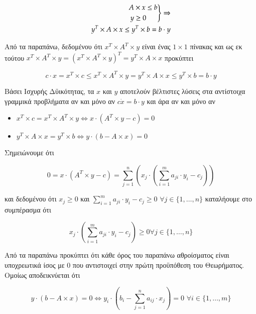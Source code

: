 \documentclass[12pt]{article}
\newcommand{\margin}{\hspace{4pt}}
\newenvironment{rcases}
	{\left.\begin{aligned}}
	{\end{aligned}\right\rbrace}
\begin{document}
\begin{align*}
    \begin{rcases}
        A & \times x \leq b \\
        y & \geq 0
    \end{rcases}
    \Rightarrow \\
    y^T \times A \times x \leq y^T \times b = b \cdot y
\end{align*}

Από τα παραπάνω, δεδομένου ότι \( x^T \times A^T \times y \) είναι ένας \( 1 \times 1 \)
πίνακας και ως εκ τούτου \( x^T \times A^T \times y = (x^T \times A^T \times y)^T = y^T \times A \times x\)
προκύπτει

\[ c \cdot x = x^T \times c \leq x^T \times A^T \times y = y^T \times A \times x \leq y^T \times b = b \cdot y \]

Βάσει Ισχυρής Δϋικότητας, τα \( x \) και \( y \) αποτελούν βέλτιστες λύσεις στα αντίστοιχα
γραμμικά προβλήματα αν και μόνο αν \( c \dot x = b \cdot y \) και άρα αν και μόνο αν

\begin{itemize}
    \item \( x^T \times c = x^T \times A^T \times y \Leftrightarrow x \cdot (A^T \times y - c) = 0 \)
    \item \( y^T \times A \times x = y^T \times b \Leftrightarrow y \cdot (b - A \times x) = 0 \)
\end{itemize}

Σημειώνουμε ότι

\[ 0 = x \cdot (A^T \times y - c)  = \sum_{j = 1}^{n}(x_j \cdot (\sum_{i = 1}^{m} a_{ji} \cdot y_i - c_j)) \]

και δεδομένου ότι \( x_j \geq 0 \) και \( \sum_{i = 1}^{m} a_{ji} \cdot y_i - c_j \geq 0 \)
\( \forall j \in \{1, \ldots, n \} \) καταλήουμε στο συμπέρασμα ότι

\[ x_j \cdot (\sum_{i = 1}^{m} a_{ji} \cdot y_i - c_j) \geq 0 \forall j \in \{ 1, \ldots, n \} \]

Από τα παραπάνω προκύπτει ότι κάθε όρος του παραπάνω αθροίσματος είναι υποχρεωτικά ίσος με 0
που αντιστοιχεί στην πρώτη προϋπόθεση του Θεωρήματος. \\

Ομοίως αποδεικνύεται ότι

\[ y \cdot ( b - A \times x ) = 0 \Leftrightarrow y_i \cdot ( b_i - \sum_{j = 1}^{n} a_{ij} \cdot x_j ) = 0 \margin \forall i \in \{ 1, \ldots, m \} \]

\vspace{2in}

\pagebreak
\end{document}
